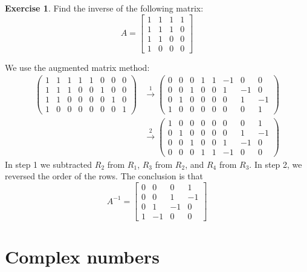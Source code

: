 \documentclass[a4paper]{book}
\newcommand{\bbm}       {\begin{bmatrix}}
\newcommand{\ebm}       {\end{bmatrix}}
\newcommand{\xra}       {\xrightarrow}
\renewcommand{\:}{\colon}
\theoremstyle{definition}
\newtheorem{exercise}[theorem]{Exercise}
\renewenvironment{solution}{\SolutionInline}{\endSolutionInline}
\begin{document}
\begin{exercise}
 Find the inverse of the following matrix:
 \[ A = \bbm
          1 & 1 & 1 & 1 \\
          1 & 1 & 1 & 0 \\
          1 & 1 & 0 & 0 \\
          1 & 0 & 0 & 0
        \ebm
 \]
\end{exercise}
\begin{solution}
 We use the augmented matrix method:
 \begin{align*}
   \left(\begin{array}{cccc|cccc}
     1&1&1&1 &1&0&0&0 \\
     1&1&1&0 &0&1&0&0 \\
     1&1&0&0 &0&0&1&0 \\
     1&0&0&0 &0&0&0&1
   \end{array}\right) & \xra{1}
   \left(\begin{array}{cccc|cccc}
     0&0&0&1 & 1&-1& 0& 0 \\
     0&0&1&0 & 0& 1&-1& 0 \\
     0&1&0&0 & 0& 0& 1&-1 \\
     1&0&0&0 & 0& 0& 0& 1
   \end{array}\right) \\ & \xra{2}
   \left(\begin{array}{cccc|cccc}
     1&0&0&0 & 0& 0& 0& 1 \\
     0&1&0&0 & 0& 0& 1&-1 \\
     0&0&1&0 & 0& 1&-1& 0 \\
     0&0&0&1 & 1&-1& 0& 0
   \end{array}\right)
 \end{align*}
 In step 1 we subtracted $R_2$ from $R_1$, $R_3$ from $R_2$, and $R_4$
 from $R_3$.  In step 2, we reversed the order of the rows.  The
 conclusion is that
 \[ A^{-1} =
     \bbm 0& 0& 0& 1 \\
          0& 0& 1&-1 \\
          0& 1&-1& 0 \\
          1&-1& 0& 0    \ebm
 \]
\end{solution}


\hypertarget{appendices}{\appendix}

\chapter{Complex numbers}
\label{apx-complex}
\end{document}
